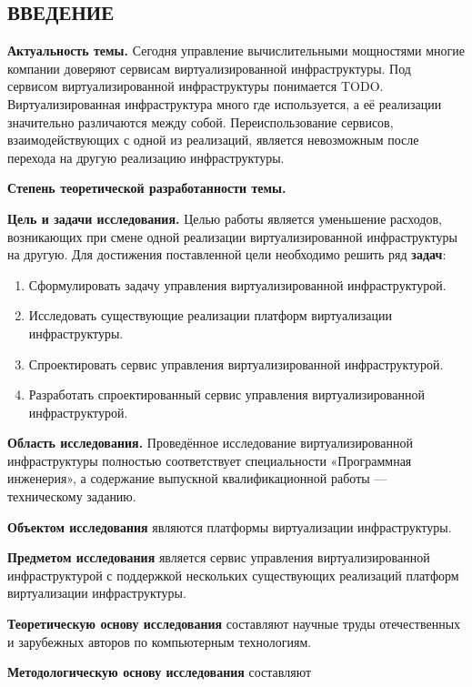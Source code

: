 \begin{center}
\section*{ВВЕДЕНИЕ}
\end{center}
\textbf{Актуальность темы.}
Сегодня управление вычислительными мощностями многие компании доверяют сервисам виртуализированной инфраструктуры. Под сервисом виртуализированной инфраструктуры понимается TODO. 
Виртуализированная инфраструктура много где используется, а её реализации значительно различаются между собой. Переиспользование сервисов, взаимодействующих с одной из реализаций, является невозможным после перехода на другую реализацию инфраструктуры.

\textbf{Степень теоретической разработанности темы.}

\textbf{Цель и задачи исследования.}
Целью работы является уменьшение расходов, возникающих при смене одной реализации виртуализированной инфраструктуры на другую.
Для достижения поставленной цели необходимо решить ряд \textbf{задач}:
\begin{enumerate}
\item Сформулировать задачу управления виртуализированной инфраструктурой.
\item Исследовать существующие реализации платформ виртуализации инфраструктуры.
\item Спроектировать сервис управления виртуализированной инфраструктурой.
\item Разработать спроектированный сервис управления виртуализированной инфраструктурой.
\end{enumerate}

\textbf{Область исследования.}
Проведённое исследование виртуализированной инфраструктуры полностью соответствует специальности «Программная инженерия», а содержание выпускной квалификационной работы --- техническому заданию.

\textbf{Объектом исследования} являются платформы виртуализации инфраструктуры.

\textbf{Предметом исследования} является сервис управления виртуализированной инфраструктурой с поддержкой нескольких существующих реализаций платформ виртуализации инфраструктуры.

\textbf{Теоретическую основу исследования} составляют научные труды отечественных и зарубежных авторов по компьютерным технологиям.

\textbf{Методологическую основу исследования} составляют 

